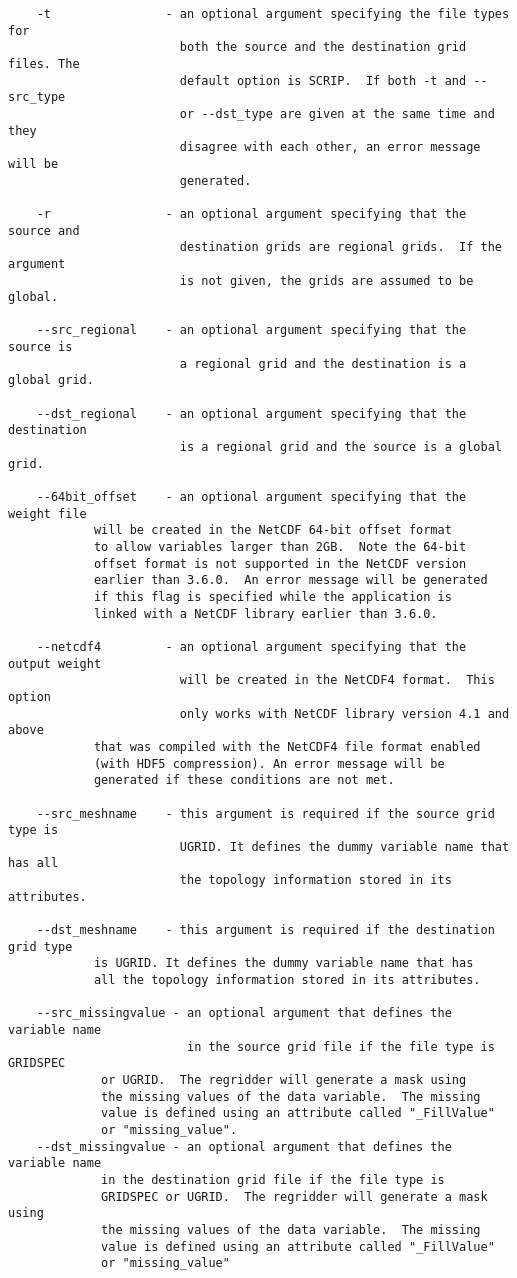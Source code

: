 \begin{verbatim}
    -t                - an optional argument specifying the file types for
                        both the source and the destination grid files. The
                        default option is SCRIP.  If both -t and --src_type
                        or --dst_type are given at the same time and they
                        disagree with each other, an error message will be
                        generated.

    -r                - an optional argument specifying that the source and
                        destination grids are regional grids.  If the argument
                        is not given, the grids are assumed to be global.

    --src_regional    - an optional argument specifying that the source is
                        a regional grid and the destination is a global grid.

    --dst_regional    - an optional argument specifying that the destination
                        is a regional grid and the source is a global grid.

    --64bit_offset    - an optional argument specifying that the weight file
			will be created in the NetCDF 64-bit offset format
			to allow variables larger than 2GB.  Note the 64-bit
			offset format is not supported in the NetCDF version
			earlier than 3.6.0.  An error message will be generated
			if this flag is specified while the application is
			linked with a NetCDF library earlier than 3.6.0.

    --netcdf4         - an optional argument specifying that the output weight
                        will be created in the NetCDF4 format.  This option 
                        only works with NetCDF library version 4.1 and above 
			that was compiled with the NetCDF4 file format enabled 
			(with HDF5 compression). An error message will be 
			generated if these conditions are not met.

    --src_meshname    - this argument is required if the source grid type is
                        UGRID. It defines the dummy variable name that has all
                        the topology information stored in its attributes.

    --dst_meshname    - this argument is required if the destination grid type
			is UGRID. It defines the dummy variable name that has
			all the topology information stored in its attributes.

    --src_missingvalue - an optional argument that defines the variable name 
                         in the source grid file if the file type is GRIDSPEC 
			 or UGRID.  The regridder will generate a mask using 
			 the missing values of the data variable.  The missing 
			 value is defined using an attribute called "_FillValue" 
			 or "missing_value". 
    --dst_missingvalue - an optional argument that defines the variable name
			 in the destination grid file if the file type is
			 GRIDSPEC or UGRID.  The regridder will generate a mask using
			 the missing values of the data variable.  The missing
			 value is defined using an attribute called "_FillValue"
			 or "missing_value"


\end{verbatim}
